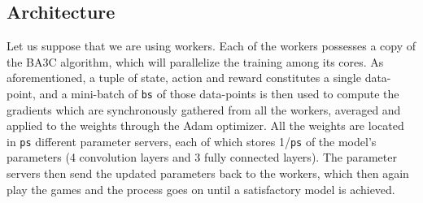 \documentclass{llncs}
\begin{document}
\subsection{Architecture} \label{subsection_architecture} Let us suppose that we are using  workers. Each of the  workers possesses a copy of the BA3C algorithm, which will parallelize the training among its  cores. As aforementioned, a tuple of state, action and reward constitutes a single data-point, and a mini-batch of \texttt{bs} of those data-points is then used to compute the gradients which are synchronously gathered from all the workers, averaged and applied to the weights through the Adam optimizer.
All the weights are located in \texttt{ps} different parameter servers, each of which stores 1/\texttt{ps} of the model's parameters (4 convolution layers and 3 fully connected layers). The parameter servers then send the updated parameters back to the workers, which then again play the games and the process goes on until a satisfactory model is achieved.\vspace{-1cm}
\end{document}

